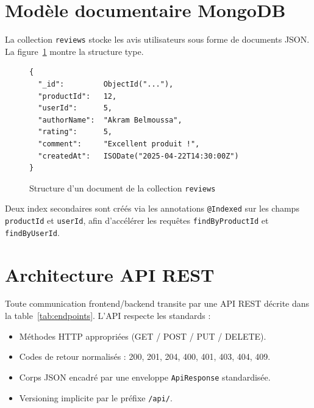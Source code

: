 \documentclass[11pt,a4paper,oneside]{report}
\begin{document}
\section{Modèle documentaire MongoDB}

La collection \texttt{reviews} stocke les avis utilisateurs sous forme de
documents JSON. La figure~\ref{fig:reviewdoc} montre la structure type.

\begin{figure}[htbp]
\centering
\begin{tcolorbox}[colback=codebg, colframe=primaryblue!50, sharp corners,
                  width=0.8\textwidth, halign=left]
\begin{verbatim}
{
  "_id":         ObjectId("..."),
  "productId":   12,
  "userId":      5,
  "authorName":  "Akram Belmoussa",
  "rating":      5,
  "comment":     "Excellent produit !",
  "createdAt":   ISODate("2025-04-22T14:30:00Z")
}
\end{verbatim}
\end{tcolorbox}
\caption{Structure d'un document de la collection \texttt{reviews}}
\label{fig:reviewdoc}
\end{figure}

Deux index secondaires sont créés via les annotations
\texttt{@Indexed} sur les champs \texttt{productId} et \texttt{userId},
afin d'accélérer les requêtes \texttt{findByProductId} et
\texttt{findByUserId}.

\section{Architecture API REST}

Toute communication frontend/backend transite par une API REST décrite
dans la table~\ref{tab:endpoints}. L'API respecte les standards :

\begin{itemize}
  \item Méthodes HTTP appropriées (GET / POST / PUT / DELETE).
  \item Codes de retour normalisés : 200, 201, 204, 400, 401, 403, 404, 409.
  \item Corps JSON encadré par une enveloppe \texttt{ApiResponse}
    standardisée.
  \item Versioning implicite par le préfixe \texttt{/api/}.
\end{itemize}
\end{document}
